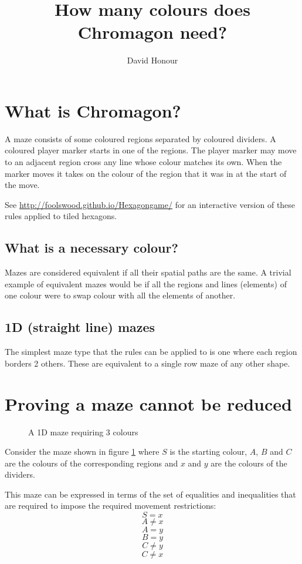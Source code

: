 \documentclass[10pt,twocolumn]{article}
\begin{document}
\title{How many colours does Chromagon need?}
\author{David Honour}
\maketitle

\section{What is Chromagon?}
A maze consists of some coloured regions separated by coloured dividers.
A coloured player marker starts in one of the regions.
The player marker may move to an adjacent region cross any line whose colour
matches its own.
When the marker moves it takes on the colour of the region that it was in at
the start of the move.

See \url{http://foolswood.github.io/Hexagongame/} for an interactive version of
these rules applied to tiled hexagons.
\subsection{What is a necessary colour?}
Mazes are considered equivalent if all their spatial paths are the same.
A trivial example of equivalent mazes would be if all the regions and lines
(elements) of one colour were to swap colour with all the elements of another.
\subsection{1D (straight line) mazes}
The simplest maze type that the rules can be applied to is one where each
region borders 2 others. These are equivalent to a single row maze of any
other shape.

\section{Proving a maze cannot be reduced}
\label{irr3}
\begin{figure}
\caption{A 1D maze requiring 3 colours}
\label{requires3}
\centering

\end{figure}
Consider the maze shown in figure \ref{requires3} where $S$ is the starting
colour, $A$, $B$ and $C$ are the colours of the corresponding regions and $x$
and $y$ are the colours of the dividers.

This maze can be expressed in terms of the set of equalities and inequalities
that are required to impose the required movement restrictions:
\begin{equation}S = x\end{equation}
\begin{equation}A \neq x \label{3neq}\end{equation}
\begin{equation}A = y\end{equation}
\begin{equation}B = y \label{3eq}\end{equation}
\begin{equation}C \neq y \label{3cny}\end{equation}
\begin{equation}C \neq x \label{3cnx}\end{equation}
\end{document}
